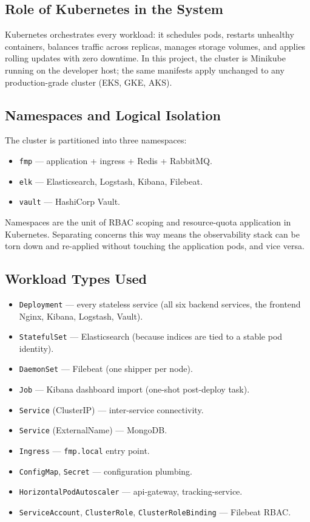 \documentclass[11pt,a4paper]{article}
\begin{document}
\subsection{Role of Kubernetes in the System}
Kubernetes orchestrates every workload: it schedules pods, restarts
unhealthy containers, balances traffic across replicas, manages
storage volumes, and applies rolling updates with zero downtime.  In
this project, the cluster is Minikube running on the developer host;
the same manifests apply unchanged to any production-grade cluster
(EKS, GKE, AKS).

\subsection{Namespaces and Logical Isolation}
The cluster is partitioned into three namespaces:

\begin{itemize}[leftmargin=*]
  \item \texttt{fmp} — application + ingress + Redis + RabbitMQ.
  \item \texttt{elk} — Elasticsearch, Logstash, Kibana, Filebeat.
  \item \texttt{vault} — HashiCorp Vault.
\end{itemize}

Namespaces are the unit of RBAC scoping and resource-quota application
in Kubernetes.  Separating concerns this way means the observability
stack can be torn down and re-applied without touching the application
pods, and vice versa.

\subsection{Workload Types Used}
\begin{itemize}[leftmargin=*]
  \item \texttt{Deployment} — every stateless service (all six backend
        services, the frontend Nginx, Kibana, Logstash, Vault).
  \item \texttt{StatefulSet} — Elasticsearch (because indices are tied
        to a stable pod identity).
  \item \texttt{DaemonSet} — Filebeat (one shipper per node).
  \item \texttt{Job} — Kibana dashboard import (one-shot post-deploy
        task).
  \item \texttt{Service} (ClusterIP) — inter-service connectivity.
  \item \texttt{Service} (ExternalName) — MongoDB.
  \item \texttt{Ingress} — \texttt{fmp.local} entry point.
  \item \texttt{ConfigMap}, \texttt{Secret} — configuration plumbing.
  \item \texttt{HorizontalPodAutoscaler} — api-gateway,
        tracking-service.
  \item \texttt{ServiceAccount}, \texttt{ClusterRole},
        \texttt{ClusterRoleBinding} — Filebeat RBAC.
\end{itemize}
\end{document}
